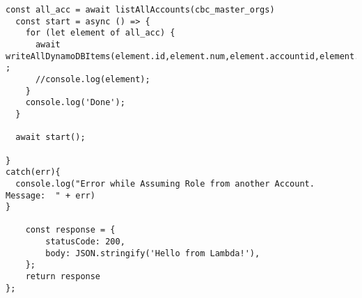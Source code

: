 \begin{lstlisting}[caption={Lambda-Code in NodeJS},
label=lst:LambdaCode,basicstyle=\ttfamily\small ]
  const all_acc = await listAllAccounts(cbc_master_orgs)
  const start = async () => {
    for (let element of all_acc) {
      await writeAllDynamoDBItems(element.id,element.num,element.accountid,element.name,element.email,element.status) ;
      //console.log(element);
    }
    console.log('Done');
  }

  await start();

}
catch(err){
  console.log("Error while Assuming Role from another Account. Message:  " + err)
}

    const response = {
        statusCode: 200,
        body: JSON.stringify('Hello from Lambda!'),
    };
    return response
};

\end{lstlisting}
